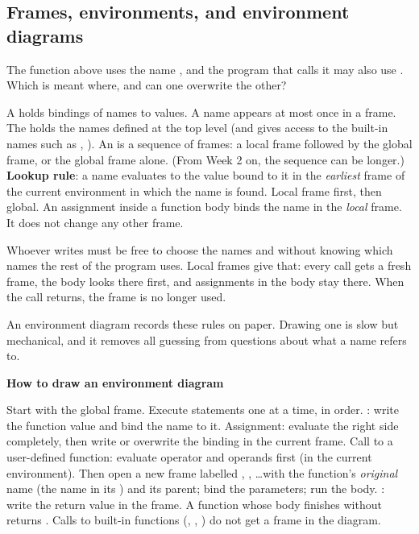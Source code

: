\documentclass[10pt]{scrartcl}
\newenvironment{howto}[1]{\begin{mdframed}[style=howtostyle]{\color{NavyBlue}\textbf{#1}}\par\vspace{2pt}}{\end{mdframed}}
\begin{document}
\subsection{Frames, environments, and environment diagrams}

\begin{qbox}
  The function  above uses the name , and the program that calls it may also use . Which  is meant where, and can one overwrite the other?
\end{qbox}
\begin{itemize}
  \ii A  holds bindings of names to values. A name appears at most once in a frame.
  \ii The  holds the names defined at the top level (and gives access to the built-in names such as , ).
  \ii An  is a sequence of frames: a local frame followed by the global frame, or the global frame alone. (From Week 2 on, the sequence can be longer.)
  \ii \textbf{Lookup rule}: a name evaluates to the value bound to it in the \emph{earliest} frame of the current environment in which the name is found. Local frame first, then global.
  \ii An assignment inside a function body binds the name in the \emph{local} frame. It does not change any other frame.
\end{itemize}
\begin{ideabox}
Whoever writes  must be free to choose the names  and  without knowing which names the rest of the program uses. Local frames give that: every call gets a fresh frame, the body looks there first, and assignments in the body stay there. When the call returns, the frame is no longer used.

An environment diagram records these rules on paper. Drawing one is slow but mechanical, and it removes all guessing from questions about what a name refers to.
\end{ideabox}

\begin{howto}{How to draw an environment diagram}
\begin{steps}
  \ii Start with the global frame. Execute statements one at a time, in order.
  \ii {}: write the function value  and bind the name to it.
  \ii Assignment: evaluate the right side completely, then write or overwrite the binding in the current frame.
  \ii Call to a user-defined function: evaluate operator and operands first (in the current environment). Then open a new frame labelled , , \dots with the function's \emph{original} name (the name in its ) and its parent; bind the parameters; run the body.
  \ii {}: write the return value in the frame. A function whose body finishes without  returns .
  \ii Calls to built-in functions (, , ) do not get a frame in the diagram.
\end{steps}
\end{howto}
\end{document}
